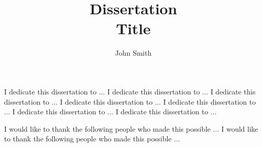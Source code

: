 \documentclass[11 pt]{report}
\begin{document}
\title{Dissertation\\
            Title}
\author{John Smith}












\signaturepage

\titlepage

\copyrightpage


\dedicationpage

\noindent I dedicate this dissertation to ...
I dedicate this dissertation to ...
I dedicate this dissertation to ...
I dedicate this dissertation to ...
I dedicate this dissertation to ...
I dedicate this dissertation to ...
I dedicate this dissertation to ...


\acknowledgementspage

\noindent I would like to thank the following people who made this possible ...
I would like to thank the following people who made this possible ...
\end{document}
